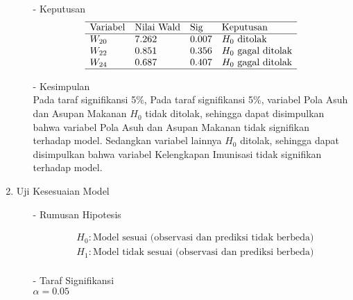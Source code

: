 \begin{enumerate}
\begin{test}
{\begin{enumerate}
        \item[-] Keputusan \\
        $$\begin{array}{lllll}
            \hline 
            \text{Variabel} & \text{Nilai Wald} & \text{Sig} & \text{Keputusan}  \\
            \hline 
            W_{20} & 7.262 & 0.007 & H_0 \text{ ditolak} \\
            W_{22} & 0.851 & 0.356 & H_0 \text{ gagal ditolak} \\
            W_{24} & 0.687 & 0.407 & H_0 \text{ gagal ditolak} \\
            \hline
        \end{array}$$
    
        \item[-] Kesimpulan \\
        Pada taraf signifikansi 5\%, Pada taraf signifikansi 5\%, variabel Pola Asuh dan Asupan Makanan $H_0$ tidak ditolak, sehingga dapat disimpulkan bahwa variabel Pola Asuh dan Asupan Makanan tidak signifikan terhadap model. Sedangkan variabel lainnya $H_0$ ditolak, sehingga dapat disimpulkan bahwa variabel Kelengkapan Imunisasi tidak signifikan terhadap model.
    \end{enumerate}
    }
    \end{test}
    
    \item Uji Kesesuaian Model
    \begin{test}{
    \begin{enumerate}
        \item[-] Rumusan Hipotesis \\
        \begin{fleqn}[\parindent]
            \begin{equation*}
            \begin{split}
            &H_0 : \text{Model sesuai (observasi dan prediksi tidak berbeda)} \\ 
            &H_1 : \text{Model tidak sesuai (observasi dan prediksi berbeda)} \\
            \end{split}
            \end{equation*}
        \end{fleqn}
    
        \item[-] Taraf Signifikansi \\
        $\alpha = 0.05$
    

\end{enumerate}}
\end{test}
\end{enumerate}
